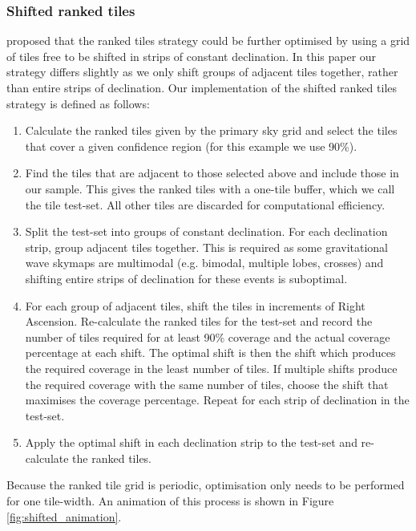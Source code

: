 \subsubsection{Shifted ranked tiles}
\label{sec:shifted_ranked_tiles}
\citet{2016A&A...592A..82G} proposed that the ranked tiles strategy could be further optimised by using a grid of tiles free to be shifted in strips of constant declination. In this paper our strategy differs slightly as we only shift groups of adjacent tiles together, rather than entire strips of declination. Our implementation of the shifted ranked tiles strategy is defined as follows:

\begin{enumerate}
	\item Calculate the ranked tiles given by the primary sky grid and select the tiles that cover a given confidence region (for this example we use 90\%).
	
	\item Find the tiles that are adjacent to those selected above and include those in our sample. This gives the ranked tiles with a one-tile buffer, which we call the tile test-set. All other tiles are discarded for computational efficiency.
	
    \item Split the test-set into groups of constant declination. For each declination strip, group adjacent tiles together. This is required as some gravitational wave skymaps are multimodal (e.g. bimodal, multiple lobes, crosses) and shifting entire strips of declination for these events is suboptimal.
    
    \item For each group of adjacent tiles, shift the tiles in increments of Right Ascension. Re-calculate the ranked tiles for the test-set and record the number of tiles required for at least 90\% coverage and the actual coverage percentage at each shift. The optimal shift is then the shift which produces the required coverage in the least number of tiles. If multiple shifts produce the required coverage with the same number of tiles, choose the shift that maximises the coverage percentage. Repeat for each strip of declination in the test-set.
	
	\item Apply the optimal shift in each declination strip to the test-set and re-calculate the ranked tiles. 
\end{enumerate}
Because the ranked tile grid is periodic, optimisation only needs to be performed for one tile-width. An animation of this process is shown in Figure \ref{fig:shifted_animation}.






